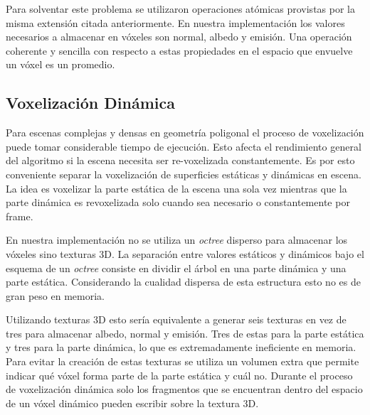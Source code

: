 Para solventar este problema se utilizaron operaciones atómicas provistas por la misma extensión citada anteriormente. En nuestra implementación los valores necesarios a almacenar en vóxeles son normal, albedo y emisión. Una operación coherente y sencilla con respecto a estas propiedades en el espacio que envuelve un vóxel es un promedio.

\subsection{Voxelización Dinámica} %
\label{sub:voxelizacion_dinamica}
Para escenas complejas y densas en geometría poligonal el proceso de voxelización puede tomar considerable tiempo de ejecución. Esto afecta el rendimiento general del algoritmo si la escena necesita ser re-voxelizada constantemente. Es por esto conveniente separar la voxelización de superficies estáticas y dinámicas en escena. La idea es voxelizar la parte estática de la escena una sola vez mientras que la parte dinámica es revoxelizada solo cuando sea necesario o constantemente por frame.

En nuestra implementación no se utiliza un \emph{octree} disperso para almacenar los vóxeles sino texturas 3D. La separación entre valores estáticos y dinámicos bajo el esquema de un \emph{octree} consiste en dividir el árbol en una parte dinámica y una parte estática. Considerando la cualidad dispersa de esta estructura esto no es de gran peso en memoria. 

Utilizando texturas 3D esto sería equivalente a generar seis texturas en vez de tres para almacenar albedo, normal y emisión. Tres de estas para la parte estática y tres para la parte dinámica, lo que es extremadamente ineficiente en memoria. Para evitar la creación de estas texturas se utiliza un volumen extra que permite indicar qué vóxel forma parte de la parte estática y cuál no. Durante el proceso de voxelización dinámica solo los fragmentos que se encuentran dentro del espacio de un vóxel dinámico pueden escribir sobre la textura 3D.
